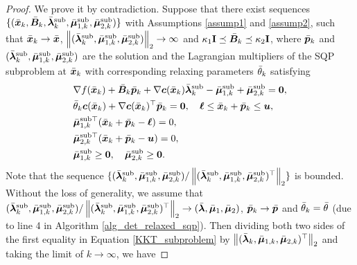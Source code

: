 \documentclass[aos]{imsart}
\numberwithin{equation}{section}
\theoremstyle{plain}
\begin{document}
\begin{appendix}
\begin{proof}
    We prove it by contradiction. Suppose that there exist sequences $\{(\Bar{\bm{x}}_k, \Bar{\bm{B}}_k, \Bar{\bm{\lambda}}_{k}^{\text{sub}}, \Bar{\bm{\mu}}_{1,k}^{\text{sub}}, \Bar{\bm{\mu}}_{2,k}^{\text{sub}})\}$ with Assumptions \ref{assump1} and \ref{assump2}, such that 
    $\Bar{\bm{x}}_k \to \Bar{\bm{x}}$, $\left\| (\Bar{\bm{\lambda}}_{k}^{\text{sub}}, \Bar{\bm{\mu}}_{1,k}^{\text{sub}}, \Bar{\bm{\mu}}_{2,k}^{\text{sub}})\right\|_2 \to \infty$ and $\kappa_1 \mathbf{I} \preceq \Bar{\bm{B}}_k \preceq \kappa_2 \mathbf{I}$, where $\Bar{\bm{p}}_k$ and $(\Bar{\bm{\lambda}}_{k}^{\text{sub}}, \Bar{\bm{\mu}}_{1,k}^{\text{sub}}, \Bar{\bm{\mu}}_{2,k}^{\text{sub}})$ are the solution and the Lagrangian multipliers of the SQP subproblem at $\Bar{\bm{x}}_k$ with corresponding relaxing parameters $\Bar{\theta}_k$ satisfying
    \begin{equation}
    \label{KKT_subproblem}
        \begin{split}
            & \nabla f (\Bar{\bm{x}}_k) + \Bar{\bm{B}}_k \Bar{\bm{p}}_k+ \nabla \bm{c}(\Bar{\bm{x}}_k) \Bar{\bm{\lambda}}_{k}^{\text{sub}} - \Bar{\bm{\mu}}_{1,k}^{\text{sub}} + \Bar{\bm{\mu}}_{2,k}^{\text{sub}} = \bm{0},\\
            & \Bar{\theta}_k \bm{c}(\Bar{\bm{x}}_k) + \nabla \bm{c}(\Bar{\bm{x}}_k)^{\top} \Bar{\bm{p}}_k = \bm{0},\quad \bm{\ell} \leq \Bar{\bm{x}}_k + \Bar{\bm{p}}_k \leq \bm{u},\\
            & \Bar{\bm{\mu}}_{1,k}^{\text{sub} \top} (\Bar{\bm{x}}_k + \Bar{\bm{p}}_k - \bm{\ell}) = 0,\\
            & \Bar{\bm{\mu}}_{2,k}^{\text{sub}\top}(\Bar{\bm{x}}_k + \Bar{\bm{p}}_k - \bm{u}) = 0,\\
            & \Bar{\bm{\mu}}_{1,k}^{\text{sub}} \geq \bm{0}, \quad \Bar{\bm{\mu}}_{2,k}^{\text{sub}} \geq \bm{0}.
        \end{split}
    \end{equation}
    Note that the sequence $\{(\Bar{\bm{\lambda}}_{k}^{\text{sub}}, \Bar{\bm{\mu}}_{1,k}^{\text{sub}}, \Bar{\bm{\mu}}_{2,k}^{\text{sub}}) / \left\| (\Bar{\bm{\lambda}}_{k}^{\text{sub}}, \Bar{\bm{\mu}}_{1,k}^{\text{sub}}, \Bar{\bm{\mu}}_{2,k}^{\text{sub}})^{\top}\right\|_2\}$ is bounded. Without the loss of generality, we assume that $(\Bar{\bm{\lambda}}_{k}^{\text{sub}}, \Bar{\bm{\mu}}_{1,k}^{\text{sub}}, \Bar{\bm{\mu}}_{2,k}^{\text{sub}}) / \left\| (\Bar{\bm{\lambda}}_{k}^{\text{sub}}, \Bar{\bm{\mu}}_{1,k}^{\text{sub}}, \Bar{\bm{\mu}}_{2,k}^{\text{sub}})^{\top}\right\|_2 \to (\Bar{\bm{\lambda}}, \Bar{\bm{\mu}}_{1}, \Bar{\bm{\mu}}_{2})$, $\Bar{\bm{p}}_k \to \Bar{\bm{p}}$ and $\Bar{\theta}_k = \Bar{\theta}$ (due to line 4 in Algorithm \ref{alg_det_relaxed_sqp}). Then dividing both two sides of the first equality in  Equation \eqref{KKT_subproblem} by $\left\| (\Bar{\bm{\lambda}}_{k}, \Bar{\bm{\mu}}_{1,k}, \Bar{\bm{\mu}}_{2,k})^{\top}\right\|_2$ and taking the limit of $k \to \infty$, we have 

\end{proof}
\end{appendix}
\end{document}
